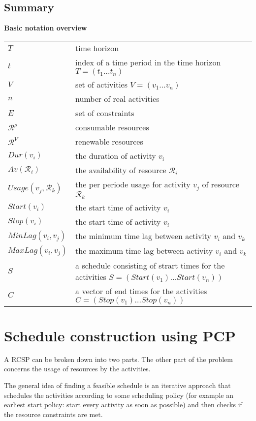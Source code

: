 \documentclass{article}
\newcommand{\leading}[1]{\textbf{#1}}
\begin{document}
\subsection{Summary}
\leading{Basic notation overview} \\
\begin{tabular}{l l}
\hline
$T$ & time horizon \\
$t$ & index of a time period in the time horizon $T = (t_1 \ldots t_n)$\\
$V$ & set of activities $V = (v_1 \ldots v_n)$ \\
$n$ & number of real activities \\
$E$ & set of constraints \\
$\mathcal{R}^{\rho}$ & consumable resources \\
$\mathcal{R}^V$ & renewable resources \\
$Dur(v_i)$ & the duration of activity $v_i$ \\
$Av(\mathcal{R}_i)$ & the availability of resource $\mathcal{R}_i$ \\
$Usage(v_j, \mathcal{R}_k)$ & the per periode usage for activity $v_j$ of resource $\mathcal{R}_k$ \\
$Start(v_i)$ & the start time of activity $v_i$ \\
$Stop(v_i)$ & the start time of activity $v_i$ \\
$MinLag(v_i, v_j)$ & the minimum time lag between activity $v_i$ and $v_k$ \\
$MaxLag(v_i, v_j)$ & the maximum time lag between activity $v_i$ and $v_k$ \\
$S$ & a schedule consisting of strart times for the activities $S = (Start(v_1) \ldots Start(v_n))$ \\
$C$ & a vector of end times for the activities $C = (Stop(v_1) \ldots Stop(v_n))$ \\
\hline
\end{tabular}

\newpage

\section{Schedule construction using PCP}
A RCSP can be broken down into two parts.  The other part of the problem concerns the usage of resources by the activities. 

The general idea of finding a feasible schedule is an iterative approach that schedules the activities according to some scheduling policy (for example an earliest start policy: start every activity as soon as possible) and then checks if the resource constraints are met. 
\end{document}
